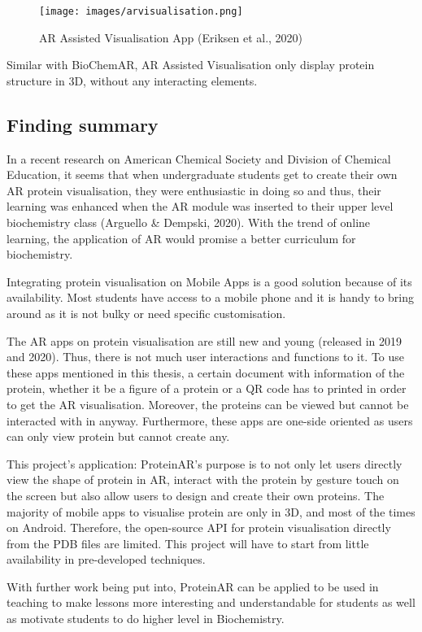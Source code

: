 \begin{figure}[!htbp]
	\centering
	\texttt{[image: images/arvisualisation.png]}
	\caption{AR Assisted Visualisation App (Eriksen et al., 2020)}
	\label{fig:arvisualisation}
\end{figure}

Similar with BioChemAR, AR Assisted Visualisation only display protein structure in 3D, without any interacting elements. 

\subsection{Finding summary}
In a recent research on American Chemical Society and Division of Chemical Education, it seems that when undergraduate students get to create their own AR protein visualisation, they were enthusiastic in doing so and thus, their learning was enhanced when the AR module was inserted to their upper level biochemistry class (Arguello \& Dempski, 2020). With the trend of online learning, the application of AR would promise a better curriculum for biochemistry.

Integrating protein visualisation on Mobile Apps is a good solution because of its availability. Most students have access to a mobile phone and it is handy  to bring around as it is not bulky or need specific customisation. 

The AR apps on protein visualisation are still new and young (released in 2019 and 2020). Thus, there is not much user interactions and functions to it. To use these apps mentioned in this thesis, a certain document with information of the protein, whether it be a figure of a protein or a QR code has to printed in order to get the AR visualisation. Moreover, the proteins can be viewed but cannot be interacted with in anyway. Furthermore, these apps are one-side oriented as users can only view protein but cannot create any. 

This project’s application: ProteinAR’s purpose is to not only let users directly view the shape of protein in AR, interact with the protein by gesture touch on the screen but also allow users to design and create their own proteins. 
The majority of mobile apps to visualise protein are only in 3D, and most of the times on Android. Therefore, the open-source API for protein visualisation directly from the PDB files are limited. This project will have to start from little availability in pre-developed techniques.

With further work being put into, ProteinAR can be applied to be used in teaching to make lessons more interesting and understandable for students as well as motivate students to do higher level in Biochemistry. 




